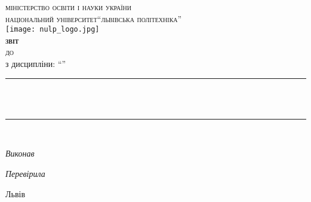 \newcommand{\LINE}{\rule{\linewidth}{0.4mm}}	
\begin{titlepage} 	
	\center 
	
	\textsc{міністерство освіти і науки україни}\\
	\textsc{національний університет"`львівська політехніка"'}\\
	[1.5cm]

	\texttt{[image: nulp\_logo.jpg]}\\[1.5cm]

	\textsc{\LARGE\bfseries звіт}\\	
	\textsc{ до \Type \, \Number}\\ 
  з дисципліни: "`\Subject"'\\
	
	\LINE\\[0.2cm]
	\large
	\textsc{\bfseries \Theme}\\[0cm] 
	\normalsize
	\LINE\\[1cm]


	\begin{flushright}
		\large
		\textit{Виконав}\\
		\normalsize
		\Class \; \textsc{\Author} 

		\large
		\textit{Перевірила}\\
		\normalsize
		\Position \; \textsc{\Teacher}
	\end{flushright}

	\vfill
	Львів	\the\year{}
\end{titlepage}
\Margins
